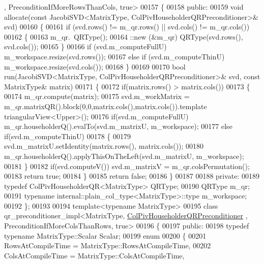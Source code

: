 \begin{DoxyCode}
      , PreconditionIfMoreRowsThanCols, true>
00157 \{
00158 \textcolor{keyword}{public}:
00159   \textcolor{keywordtype}{void} allocate(\textcolor{keyword}{const} JacobiSVD<MatrixType, ColPivHouseholderQRPreconditioner>& svd)
00160   \{
00161     \textcolor{keywordflow}{if} (svd.rows() != m\_qr.rows() || svd.cols() != m\_qr.cols())
00162     \{
00163       m\_qr.~QRType();
00164       ::new (&m\_qr) QRType(svd.rows(), svd.cols());
00165     \}
00166     \textcolor{keywordflow}{if} (svd.m\_computeFullU) m\_workspace.resize(svd.rows());
00167     \textcolor{keywordflow}{else} \textcolor{keywordflow}{if} (svd.m\_computeThinU) m\_workspace.resize(svd.cols());
00168   \}
00169 
00170   \textcolor{keywordtype}{bool} run(JacobiSVD<MatrixType, ColPivHouseholderQRPreconditioner>& svd, \textcolor{keyword}{const} MatrixType& matrix)
00171   \{
00172     \textcolor{keywordflow}{if}(matrix.rows() > matrix.cols())
00173     \{
00174       m\_qr.compute(matrix);
00175       svd.m\_workMatrix = m\_qr.matrixQR().block(0,0,matrix.cols(),matrix.cols()).\textcolor{keyword}{template} 
      triangularView<Upper>();
00176       \textcolor{keywordflow}{if}(svd.m\_computeFullU) m\_qr.householderQ().evalTo(svd.m\_matrixU, m\_workspace);
00177       \textcolor{keywordflow}{else} \textcolor{keywordflow}{if}(svd.m\_computeThinU)
00178       \{
00179         svd.m\_matrixU.setIdentity(matrix.rows(), matrix.cols());
00180         m\_qr.householderQ().applyThisOnTheLeft(svd.m\_matrixU, m\_workspace);
00181       \}
00182       \textcolor{keywordflow}{if}(svd.computeV()) svd.m\_matrixV = m\_qr.colsPermutation();
00183       \textcolor{keywordflow}{return} \textcolor{keyword}{true};
00184     \}
00185     \textcolor{keywordflow}{return} \textcolor{keyword}{false};
00186   \}
00187 
00188 \textcolor{keyword}{private}:
00189   \textcolor{keyword}{typedef} ColPivHouseholderQR<MatrixType> QRType;
00190   QRType m\_qr;
00191   \textcolor{keyword}{typename} internal::plain\_col\_type<MatrixType>::type m\_workspace;
00192 \};
00193 
00194 \textcolor{keyword}{template}<\textcolor{keyword}{typename} MatrixType>
00195 \textcolor{keyword}{class }qr\_preconditioner\_impl<MatrixType, \hyperlink{group__enums_gga46eba0d5c621f590b8cf1b53af31d56eaebc52a2365eec1df700ea97bd7af2d9a}{ColPivHouseholderQRPreconditioner}
      , PreconditionIfMoreColsThanRows, true>
00196 \{
00197 \textcolor{keyword}{public}:
00198   \textcolor{keyword}{typedef} \textcolor{keyword}{typename} MatrixType::Scalar Scalar;
00199   \textcolor{keyword}{enum}
00200   \{
00201     RowsAtCompileTime = MatrixType::RowsAtCompileTime,
00202     ColsAtCompileTime = MatrixType::ColsAtCompileTime,

\end{DoxyCode}
